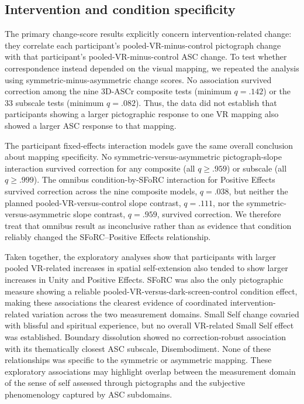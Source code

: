\documentclass[pdflatex,sn-basic,lineno]{../sn-jnl}
\begin{document}
\subsection{Intervention and condition specificity}

The primary change-score results explicitly concern intervention-related change: they correlate each participant's pooled-VR-minus-control pictograph change with that participant's pooled-VR-minus-control ASC change. To test whether correspondence instead depended on the visual mapping, we repeated the analysis using symmetric-minus-asymmetric change scores. No association survived correction among the nine 3D-ASCr composite tests (minimum $q=.142$) or the 33 subscale tests (minimum $q=.082$). Thus, the data did not establish that participants showing a larger pictographic response to one VR mapping also showed a larger ASC response to that mapping.

The participant fixed-effects interaction models gave the same overall conclusion about mapping specificity. No symmetric-versus-asymmetric pictograph-slope interaction survived correction for any composite (all $q\geq.959$) or subscale (all $q\geq.999$). The omnibus condition-by-SFoRC interaction for Positive Effects survived correction across the nine composite models, $q=.038$, but neither the planned pooled-VR-versus-control slope contrast, $q=.111$, nor the symmetric-versus-asymmetric slope contrast, $q=.959$, survived correction. We therefore treat that omnibus result as inconclusive rather than as evidence that condition reliably changed the SFoRC--Positive Effects relationship.

Taken together, the exploratory analyses show that participants with larger pooled VR-related increases in spatial self-extension also tended to show larger increases in Unity and Positive Effects. SFoRC was also the only pictographic measure showing a reliable pooled-VR-versus-dark-screen-control condition effect, making these associations the clearest evidence of coordinated intervention-related variation across the two measurement domains. Small Self change covaried with blissful and spiritual experience, but no overall VR-related Small Self effect was established. Boundary dissolution showed no correction-robust association with its thematically closest ASC subscale, Disembodiment. None of these relationships was specific to the symmetric or asymmetric mapping. These exploratory associations may highlight overlap between the measurement domain of the sense of self assessed through pictographs and the subjective phenomenology captured by ASC subdomains.
\end{document}
